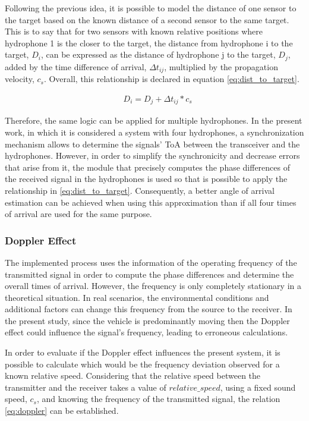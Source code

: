 Following the previous idea, it is possible to model the distance of one sensor to the target based on the known distance of a second sensor to the same target. 
This is to say that for two sensors with known relative positions where hydrophone 1 is the closer to the target, the distance from hydrophone i to the target, $D_i$, can be expressed as the distance of hydrophone j to the target, $D_j$, added by the time difference of arrival, $\Delta t_{ij}$, multiplied by the propagation velocity, $c_s$. Overall, this relationship is declared in equation \ref{eq:dist_to_target}.

\begin{eqnarray}
& D_i = D_j + \Delta t_{ij} * c_s
\label{eq:dist_to_target}
\end{eqnarray}

Therefore, the same logic can be applied for multiple hydrophones. In the present work, in which it is considered a system with four hydrophones, a synchronization mechanism allows to determine the signals' ToA between the transceiver and the hydrophones. However, in order to simplify the synchronicity and decrease errors that arise from it, the module that precisely computes the phase differences of the received signal in the hydrophones is used so that is possible to apply the relationship in \ref{eq:dist_to_target}. Consequently, a better angle of arrival estimation can be achieved when using this approximation than if all four times of arrival are used for the same purpose.

\subsubsection{Doppler Effect}

The implemented process uses the information of the operating frequency of the transmitted signal in order to compute the phase differences and determine the overall times of arrival. However, the frequency is only completely stationary in a theoretical situation. In real scenarios, the environmental conditions and additional factors can change this frequency from the source to the receiver. In the present study, since the vehicle is predominantly moving then the Doppler effect could influence the signal's frequency, leading to erroneous calculations.

In order to evaluate if the Doppler effect influences the present system, it is possible to calculate which would be the frequency deviation observed for a known relative speed. Considering that the relative speed between the transmitter and the receiver takes a value of $relative\_speed$, using a fixed sound speed, $c_s$, and knowing the frequency of the transmitted signal, the relation \ref{eq:doppler} can be established. 

